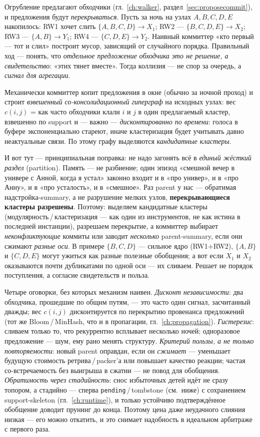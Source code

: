 Огрубление предлагают обходчики (гл.~\ref{ch:walker}, раздел~\ref{sec:proposecommit}),
и предложения будут \emph{перекрываться}. Пусть за ночь на узлах $A,B,C,D,E$ накопилось:
RW1 хочет слить $\{A,B,C,D\}\to X_1$; RW2 — $\{B,C,D,E\}\to X_2$; RW3 — $\{A,B\}\to Y_1$;
RW4 — $\{C,D,E\}\to Y_2$. Наивный коммиттер «кто первый — тот и слил» построит мусор,
зависящий от случайного порядка. Правильный ход — понять, что \emph{отдельное
предложение обходчика это не решение, а свидетельство}: «этих тянет вместе». Тогда
коллизия — не спор за очередь, а \emph{сигнал для агрегации}.

Механически коммиттер копит предложения в окне (обычно за ночной проход) и строит
\emph{взвешенный со-консолидационный гиперграф} на исходных узлах: вес $c(i,j)$ = как
часто обходчики клали $i$ и $j$ в один предлагаемый кластер, взвешенно по support и —
важно — \emph{дисконтированно по времени}: голоса в буфере экспоненциально стареют,
иначе кластеризация будет учитывать давно неактуальные связи. По этому графу выделяются
\emph{кандидатные кластеры}.

И вот тут — принципиальная поправка: не надо загонять всё в \emph{единый жёсткий
раздел} (partition). Память — не разбиение; один эпизод «смешной вечер в универе с Анной,
когда я устал» законно входит и в «про универ», и в «про Анну», и в «про усталость», и в
«смешное». Раз parent у нас — обратимая надстройка-summary, а не разрушение мелких узлов,
\textbf{перекрывающиеся кластеры разрешены}. Поэтому: выделяем кандидатные кластеры
(модулярность\,/\,кластеризация — как один из инструментов, не как истина в последней
инстанции), разрешаем перекрытие, а коммиттер выбирает \emph{неконфликтующие} коммиты или
заводит \emph{несколько} parent-summary, если они сжимают \emph{разные оси}. В примере
$\{B,C,D\}$ — сильное ядро (RW1$+$RW2), $\{A,B\}$ и $\{C,D,E\}$ могут ужиться как разные
полезные обобщения; а вот если $X_1$ и $X_2$ оказываются почти дубликатами по одной оси —
их сливаем. Решает не порядок поступления, а согласие свидетельств и польза.

Четыре оговорки, без которых механизм наивен. \emph{Дисконт независимости}: два
обходчика, прошедшие по общим путям, — это часто один сигнал, засчитанный дважды; вес
$c(i,j)$ дисконтируется по перекрытию провенанса предложений (тот же Bloom\,/\,MinHash,
что и в пропагации, гл.~\ref{ch:propagation}). \emph{Гистерезис}: сливаем только то, что
рекуррентно всплывает несколько ночей; одноразовое предложение — шум, ему рано менять
структуру. \emph{Критерий пользы, а не только повторяемости}: новый parent
оправдан, если он \emph{сжимает} — уменьшает будущую стоимость ретрива\,/\,packer'а или
повышает качество реакции; частая со-встречаемость без выигрыша в сжатии — не повод для
обобщения. \emph{Обратимость через стадийность}: снос избыточных детей идёт не сразу
топором, а стадийно — сперва \texttt{pending}\,/\,tombstone (см.\ ниже) с сохранением
support-skeleton (гл.~\ref{ch:runtime}), и только устойчиво подтверждённое обобщение
доводит прунинг до конца. Поэтому цена даже неудачного слияния низкая — его можно
откатить, и это снимает надобность в идеальном арбитраже с первого раза.

